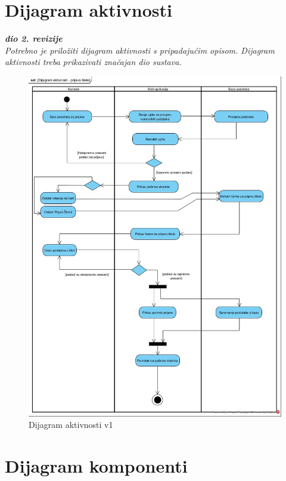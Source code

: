 \eject

\section{Dijagram aktivnosti}

\textbf{\textit{dio 2. revizije}}\\

\textit{Potrebno je priložiti dijagram aktivnosti s pripadajućim opisom. Dijagram aktivnosti treba prikazivati značajan dio sustava.}

\begin{figure}[H]
	\includegraphics[scale=0.5]{slike/DA.jpg} %
	\centering
	\caption{Dijagram aktivnosti v1}
	\label{fig:DijagramAktivnosti}
\end{figure}

\eject
\section{Dijagram komponenti}

